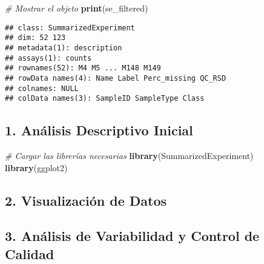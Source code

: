 \documentclass[
]{article}
\newenvironment{Shaded}{\begin{snugshade}}{\end{snugshade}}
\newcommand{\CommentTok}[1]{\textcolor[rgb]{0.56,0.35,0.01}{\textit{#1}}}
\newcommand{\DecValTok}[1]{\textcolor[rgb]{0.00,0.00,0.81}{#1}}
\newcommand{\FunctionTok}[1]{\textcolor[rgb]{0.13,0.29,0.53}{\textbf{#1}}}
\newcommand{\NormalTok}[1]{#1}
\newcommand{\OtherTok}[1]{\textcolor[rgb]{0.56,0.35,0.01}{#1}}
\newcommand{\SpecialCharTok}[1]{\textcolor[rgb]{0.81,0.36,0.00}{\textbf{#1}}}
\begin{document}
\begin{Shaded}
\end{Shaded}

\begin{Shaded}
\begin{Highlighting}[]
\CommentTok{\# Mostrar el objeto}
\FunctionTok{print}\NormalTok{(se\_filtered)}
\end{Highlighting}
\end{Shaded}

\begin{verbatim}
## class: SummarizedExperiment 
## dim: 52 123 
## metadata(1): description
## assays(1): counts
## rownames(52): M4 M5 ... M148 M149
## rowData names(4): Name Label Perc_missing QC_RSD
## colnames: NULL
## colData names(3): SampleID SampleType Class
\end{verbatim}

\subsection{1. Análisis Descriptivo
Inicial}\label{anuxe1lisis-descriptivo-inicial}

\begin{Shaded}
\begin{Highlighting}[]
\CommentTok{\# Cargar las librerías necesarias}
\FunctionTok{library}\NormalTok{(SummarizedExperiment)}
\FunctionTok{library}\NormalTok{(ggplot2)}
\end{Highlighting}
\end{Shaded}

\subsection{2. Visualización de Datos}\label{visualizaciuxf3n-de-datos}

\subsection{3. Análisis de Variabilidad y Control de
Calidad}\label{anuxe1lisis-de-variabilidad-y-control-de-calidad}
\end{document}
